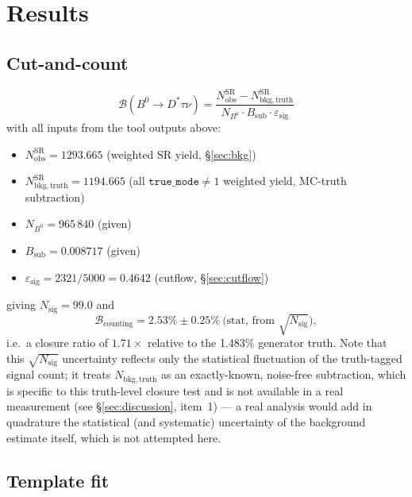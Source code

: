 \documentclass[11pt]{article}
\newcommand{\BF}{\mathcal{B}}
\begin{document}
\section{Results}
\label{sec:results}

\subsection{Cut-and-count}
\label{sec:counting}

\begin{equation*}
\BF(B^0\to D^{*}\tau\nu)
 = \frac{N_{\mathrm{obs}}^{\mathrm{SR}} - N_{\mathrm{bkg,truth}}^{\mathrm{SR}}}
        {N_{B^0}\cdot B_{\mathrm{sub}}\cdot \varepsilon_{\mathrm{sig}}}
\end{equation*}
with all inputs from the tool outputs above:
\begin{itemize}
\item $N_{\mathrm{obs}}^{\mathrm{SR}} = 1293.665$ (weighted SR yield, \S\ref{sec:bkg})
\item $N_{\mathrm{bkg,truth}}^{\mathrm{SR}} = 1194.665$ (all
  $\texttt{true\_mode} \neq 1$ weighted yield, MC-truth subtraction)
\item $N_{B^0} = 965\,840$ (given)
\item $B_{\mathrm{sub}} = 0.008717$ (given)
\item $\varepsilon_{\mathrm{sig}} = 2321/5000 = 0.4642$ (cutflow, \S\ref{sec:cutflow})
\end{itemize}
giving $N_{\mathrm{sig}} = 99.0$ and
\begin{equation*}
\BF_{\mathrm{counting}} = 2.53\% \pm 0.25\%\ \text{(stat, from $\sqrt{N_{\mathrm{sig}}}$)},
\end{equation*}
i.e.\ a closure ratio of $\mathbf{1.71\times}$ relative to the 1.483\%
generator truth. Note that this $\sqrt{N_{\mathrm{sig}}}$ uncertainty
reflects only the statistical fluctuation of the truth-tagged signal
count; it treats $N_{\mathrm{bkg,truth}}$ as an exactly-known, noise-free
subtraction, which is specific to this truth-level closure test and is
not available in a real measurement (see \S\ref{sec:discussion}, item~1)
--- a real analysis would add in quadrature the statistical (and
systematic) uncertainty of the background estimate itself, which is not
attempted here.

\subsection{Template fit}
\label{sec:fit}
\end{document}
